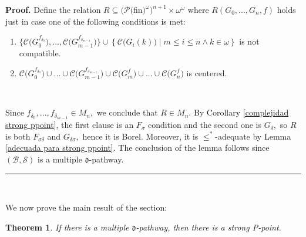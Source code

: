 \documentclass{article}%
\newtheorem{theorem}{Theorem}
\newenvironment{proof}[1][Proof]{\noindent\textbf{#1.} }{\ \rule{0.5em}{0.5em}}
\begin{document}
\begin{proof}
Define the relation $R\subseteq(\mathcal{P(}$\textsf{fin}$)^{\omega}%
)^{n+1}\times\omega^{\omega}$ where $R\left(  G_{0},...,G_{n},f\right)  $
holds just in case one of the following conditions is met:

\begin{enumerate}
\item $\{\mathcal{C(}G_{0}^{f_{\delta_{0}}}),...,\mathcal{C(}G_{m-1}%
^{f_{\delta_{m-1}}})\}\cup\left\{  \mathcal{C(}G_{i}\left(  k\right)  )\mid
m\leq i\leq n\wedge k\in\omega\right\}  $ is not compatible.

\item $\mathcal{C(}G_{0}^{f_{\delta_{0}}})\cup...\cup\mathcal{C(}%
G_{m-1}^{f_{\delta_{m-1}}})\cup\mathcal{C(}G_{m}^{f})\cup...\cup
\mathcal{C(}G_{n}^{f})$ is centered.
\end{enumerate}

\qquad\ \ \ 

Since $f_{\delta_{0}},...,f_{\delta_{m-1}}\in M_{n},$ we conclude that $R\in
M_{n}.$ By Corollary \ref{complejidad strong ppoint}, the first clause is an
$F_{\sigma}$ condition and the second one is $G_{\delta},$ so $R$ is both
$F_{\sigma\delta}$ and $G_{\delta\sigma},$ hence it is Borel. Moreover, it is
$\leq^{\ast}$-adequate by Lemma \ref{adecuada para strong ppoint}. The
conclusion of the lemma follows since $\left(  \mathcal{B},\mathcal{S}\right)
$ is a multiple $\mathfrak{d}$-pathway.
\end{proof}

\qquad\qquad\ \ 

We now prove the main result of the section:

\begin{theorem}
If there is a multiple $\mathfrak{d}$-pathway, then there is a strong
\textsf{P}-point. \label{Teorema Strong}
\end{theorem}
\end{document}
